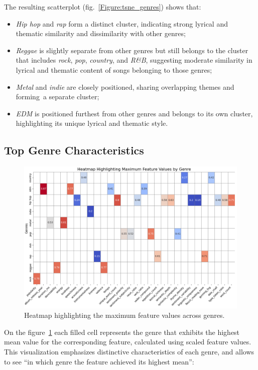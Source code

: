The resulting scatterplot (fig.~\ref{Figure:tsne_genres}) shows that:
\begin{itemize}
  \item \textit{Hip hop} and \textit{rap} form a distinct cluster, indicating
    strong lyrical and thematic similarity and dissimilarity with other genres;
  \item \textit{Reggae} is slightly separate from other genres but still
    belongs to the cluster that includes \textit{rock}, \textit{pop},
    \textit{country}, and \textit{R\&B}, suggesting moderate similarity in
    lyrical and thematic content of songs belonging to those genres;
  \item \textit{Metal} and \textit{indie} are closely positioned, sharing
    overlapping themes and forming~a  separate cluster;
  \item \textit{EDM} is positioned furthest from other genres and belongs to
    its own cluster, highlighting its unique lyrical and thematic style.
\end{itemize}

\subsection{Top Genre Characteristics}
\begin{center}
\begin{figure}[H]
  \centering
  \includegraphics[width=6in]{img/heatmap_max_feature_values_by_genre.png}
  \caption{Heatmap highlighting the maximum feature values across genres.}
  \label{Figure:heatmap_max_feature_values_by_genre}
\end{figure}
\end{center}
On the figure~\ref{Figure:heatmap_max_feature_values_by_genre} each filled
cell represents the genre that exhibits the highest mean value for the
corresponding feature, calculated using scaled feature values. This
visualization emphasizes distinctive characteristics of each genre, and allows
to see ``in  which genre the feature achieved its highest mean'':

